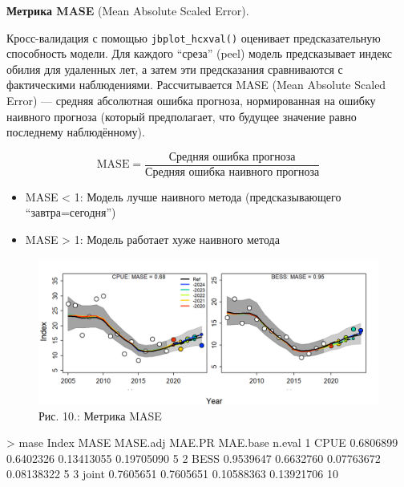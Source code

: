 \documentclass[
  letterpaper,
  DIV=11,
  numbers=noendperiod]{scrreprt}
\newenvironment{Shaded}{\begin{snugshade}}{\end{snugshade}}
\newcommand{\DecValTok}[1]{\textcolor[rgb]{0.68,0.00,0.00}{#1}}
\newcommand{\FloatTok}[1]{\textcolor[rgb]{0.68,0.00,0.00}{#1}}
\newcommand{\NormalTok}[1]{\textcolor[rgb]{0.00,0.23,0.31}{#1}}
\newcommand{\SpecialCharTok}[1]{\textcolor[rgb]{0.37,0.37,0.37}{#1}}
\begin{document}
\textbf{Метрика MASE} (Mean Absolute Scaled Error).

Кросс-валидация с помощью \texttt{jbplot\_hcxval()} оценивает
предсказательную способность модели. Для каждого ``среза'' (peel) модель
предсказывает индекс обилия для удаленных лет, а затем эти предсказания
сравниваются с фактическими наблюдениями. Рассчитывается MASE (Mean
Absolute Scaled Error) --- средняя абсолютная ошибка прогноза,
нормированная на ошибку наивного прогноза (который предполагает, что
будущее значение равно последнему наблюдённому).

\[
\mathrm{MASE} = \frac{\text{Средняя ошибка прогноза}}{\text{Средняя ошибка наивного прогноза}}
\]

\begin{itemize}
\item
  MASE \textless{} 1: Модель лучше наивного метода (предсказывающего
  ``завтра=сегодня'')
\item
  MASE \textgreater{} 1: Модель работает хуже наивного метода
\end{itemize}

\begin{figure}[H]

{\centering \includegraphics[width=0.8\linewidth,height=\textheight,keepaspectratio]{images/JABBA10.png}

}

\caption{Рис. 10.: Метрика MASE}

\end{figure}%

\begin{Shaded}
\begin{Highlighting}[]
\SpecialCharTok{\textgreater{}}\NormalTok{ mase}
\NormalTok{  Index      MASE  MASE.adj     MAE.PR   MAE.base n.eval}
\DecValTok{1}\NormalTok{  CPUE }\FloatTok{0.6806899} \FloatTok{0.6402326} \FloatTok{0.13413055} \FloatTok{0.19705090}      \DecValTok{5}
\DecValTok{2}\NormalTok{  BESS }\FloatTok{0.9539647} \FloatTok{0.6632760} \FloatTok{0.07763672} \FloatTok{0.08138322}      \DecValTok{5}
\DecValTok{3}\NormalTok{ joint }\FloatTok{0.7605651} \FloatTok{0.7605651} \FloatTok{0.10588363} \FloatTok{0.13921706}     \DecValTok{10}
\end{Highlighting}
\end{Shaded}
\end{document}
